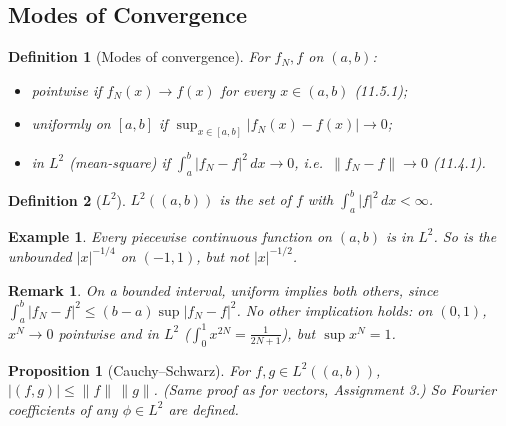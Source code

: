 \documentclass{article}
\newtheorem{definition}{Definition}
\newtheorem*{example}{Example}
\newtheorem{remark}{Remark}
\newtheorem{proposition}{Proposition}
\begin{document}
\subsection{Modes of Convergence}
\begin{definition}[Modes of convergence]
    For $f_N, f$ on $(a,b)$:
    \begin{itemize}
        \item pointwise if $f_N(x) \to f(x)$ for every $x \in (a,b)$ (11.5.1);
        \item uniformly on $[a,b]$ if $\sup_{x\in[a,b]}|f_N(x) - f(x)| \to 0$;
        \item in $L^2$ (mean-square) if $\int_a^b|f_N - f|^2\,dx \to 0$, i.e.\ $\|f_N - f\| \to 0$ (11.4.1).
    \end{itemize}
\end{definition}
\begin{definition}[$L^2$]
    $L^2((a,b))$ is the set of $f$ with $\int_a^b|f|^2\,dx < \infty$.
\end{definition}
\begin{example}
    Every piecewise continuous function on $(a,b)$ is in $L^2$. So is the unbounded $|x|^{-1/4}$ on $(-1,1)$, but not $|x|^{-1/2}$.
\end{example}
\begin{remark}
    On a bounded interval, uniform implies both others, since $\int_a^b|f_N - f|^2 \leq (b-a)\sup|f_N - f|^2$. No other implication holds: on $(0,1)$, $x^N \to 0$ pointwise and in $L^2$ ($\int_0^1 x^{2N} = \frac{1}{2N+1}$), but $\sup x^N = 1$.
\end{remark}
\begin{proposition}[Cauchy--Schwarz]
    For $f, g \in L^2((a,b))$, $|(f,g)| \leq \|f\|\,\|g\|$. (Same proof as for vectors, Assignment 3.) So Fourier coefficients of any $\phi \in L^2$ are defined.
\end{proposition}
\end{document}
